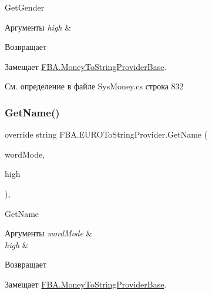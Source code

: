 Get\+Gender 


\begin{DoxyParams}{Аргументы}
{\em high} & \\
\hline
\end{DoxyParams}
\begin{DoxyReturn}{Возвращает}

\end{DoxyReturn}


Замещает \mbox{\hyperlink{class_f_b_a_1_1_money_to_string_provider_base_a24e1e1dcd1a4c42773d3ec0034a4ca6d}{F\+B\+A.\+Money\+To\+String\+Provider\+Base}}.



См. определение в файле Sys\+Money.\+cs строка 832

\mbox{\label{class_f_b_a_1_1_e_u_r_o_to_string_provider_a78caf5a60ff7d1db427ce8cc376ebf31}} 
\subsubsection{\texorpdfstring{Get\+Name()}{GetName()}}
{\footnotesize\ttfamily override string F\+B\+A.\+E\+U\+R\+O\+To\+String\+Provider.\+Get\+Name (\begin{DoxyParamCaption}\item[{Number\+To\+Russian\+String.\+Word\+Mode}]{word\+Mode,  }\item[{bool}]{high }\end{DoxyParamCaption})\hspace{0.3cm}{\ttfamily [protected]}, {\ttfamily [virtual]}}



Get\+Name 


\begin{DoxyParams}{Аргументы}
{\em word\+Mode} & \\
\hline
{\em high} & \\
\hline
\end{DoxyParams}
\begin{DoxyReturn}{Возвращает}

\end{DoxyReturn}


Замещает \mbox{\hyperlink{class_f_b_a_1_1_money_to_string_provider_base_aea712eaf4a5d84eed5624e3d48988502}{F\+B\+A.\+Money\+To\+String\+Provider\+Base}}.



